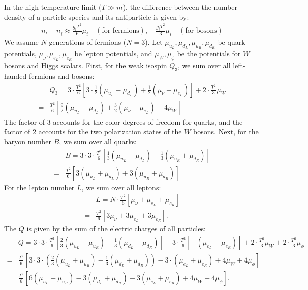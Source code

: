 In the high-temperature limit ($T \gg m$), the difference between the number density of a particle species and its antiparticle is given by:
\begin{align}
    n_i - n_{\bar{i}} \approx \frac{g_i T^2}{6} \mu_i \quad (\text{for fermions}), \quad \frac{g_i T^2}{3} \mu_i \quad (\text{for bosons})
\end{align}
We assume $N$ generations of fermions ($N=3$). Let $\mu_{u_L}, \mu_{d_L}, \mu_{u_R}, \mu_{d_R}$ be quark potentials, $\mu_{\nu}, \mu_{e_L}, \mu_{e_R}$ be lepton potentials, and $\mu_W, \mu_\phi$ be the potentials for $W$ bosons and Higgs scalars. First, for the weak isospin $Q_3$, we sum over all left-handed fermions and bosons:
\begin{align}
    &Q_3 = 3 \cdot  \frac{T^2}{6} \left[ 3\cdot \frac{1}{2}(\mu_{u_L} - \mu_{d_L}) + \frac{1}{2}(\mu_{\nu} - \mu_{e_L})  \right] + 2 \cdot \frac{T^2}{3} \mu_W\\
    =& \frac{T^2}{6} \left[ \frac{9}{2} (\mu_{u_L} - \mu_{d_L}) + \frac{3}{2}(\mu_{\nu} - \mu_{e_L}) + 4\mu_W \right]
\end{align}
The factor of 3 accounts for the color degrees of freedom for quarks, and the factor of 2 accounts for the two polarization states of the $W$ bosons. Next, for the baryon number $B$, we sum over all quarks: 
\begin{align}
    &B = 3 \cdot 3 \cdot \frac{T^2}{6} \left[ \frac{1}{3}(\mu_{u_L} + \mu_{d_L}) + \frac{1}{3}(\mu_{u_R} + \mu_{d_R})  \right] \\
    =& \frac{T^2}{6} \left[ 3(\mu_{u_L} + \mu_{d_L}) + 3(\mu_{u_R} + \mu_{d_R})  \right]
\end{align}
For the lepton number $L$, we sum over all leptons:
\begin{align}
    &L = N \cdot \frac{T^2}{6} \left[ \mu_{\nu} + \mu_{e_L} + \mu_{e_R} \right]\\
    =& \frac{T^2}{6} \left[ 3\mu_{\nu} + 3\mu_{e_L} + 3\mu_{e_R} \right].
\end{align}
The $Q$ is given by the sum of the electric charges of all particles:
\begin{align}
    &Q = 3 \cdot 3 \cdot \frac{T^2}{6} \left[ \frac{2}{3}(\mu_{u_L} + \mu_{u_R}) - \frac{1}{3}(\mu_{d_L} + \mu_{d_R})\right] + 3 \cdot \frac{T^2}{6} \left[ -(\mu_{e_L} + \mu_{e_R}) \right] + 2 \cdot \frac{T^2}{3} \mu_W+ 2 \cdot \frac{T^2}{3} \mu_\phi\\
    =& \frac{T^2}{6} \left[ 3\cdot 3 \cdot \left( \frac{2}{3}(\mu_{u_L} + \mu_{u_R}) - \frac{1}{3}(\mu_{d_L} + \mu_{d_R})\right) - 3 \cdot (\mu_{e_L} + \mu_{e_R}) + 4\mu_W + 4\mu_\phi \right]\\
    =& \frac{T^2}{6} \left[ 6(\mu_{u_L} + \mu_{u_R}) - 3(\mu_{d_L} + \mu_{d_R}) - 3(\mu_{e_L} + \mu_{e_R}) + 4\mu_W + 4\mu_\phi \right].
\end{align}
